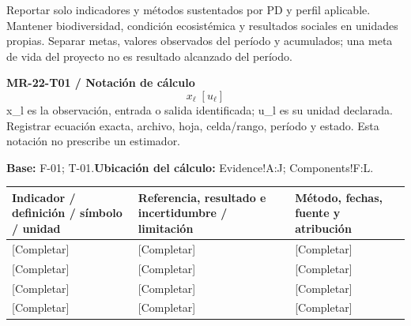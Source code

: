 Reportar solo indicadores y métodos sustentados por PD y perfil aplicable. Mantener biodiversidad, condición ecosistémica y resultados sociales en unidades propias. Separar metas, valores observados del período y acumulados; una meta de vida del proyecto no es resultado alcanzado del período.\par
{}
\par\begingroup\sffamily\fontsize{8.4}{10.5}\selectfont\color{NEBGreen}
\textbf{MR-22-T01 / Notación de cálculo}\
{\fontsize{10}{12}\selectfont\[x_{\ell}\;[u_{\ell}]\]}
x\_l es la observación, entrada o salida identificada; u\_l es su unidad declarada. Registrar ecuación exacta, archivo, hoja, celda/rango, período y estado. Esta notación no prescribe un estimador.\par
\textbf{Base:} F-01; T-01.\quad\textbf{Ubicación del cálculo:} Evidence!A:J; Components!F:L.\par\endgroup
{\sffamily\fontsize{8.6}{10.7}\selectfont\begin{longtable}{@{}P{48mm}P{61mm}P{53mm}@{}}
\toprule
\textbf{Indicador / definición / símbolo / unidad} & \textbf{Referencia, resultado e incertidumbre / limitación} & \textbf{Método, fechas, fuente y atribución}\\\midrule\endhead
\rule{0pt}{8mm}[Completar] & [Completar] & [Completar]\\\hline
\rule{0pt}{8mm}[Completar] & [Completar] & [Completar]\\\hline
\rule{0pt}{8mm}[Completar] & [Completar] & [Completar]\\\hline
\rule{0pt}{8mm}[Completar] & [Completar] & [Completar]\\\hline
\end{longtable}}
